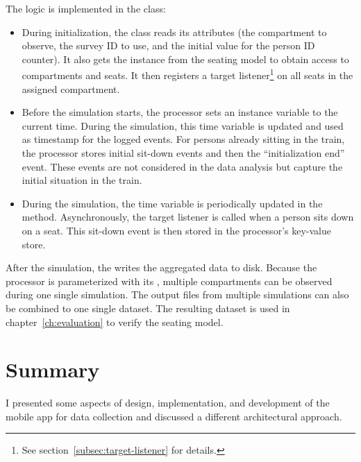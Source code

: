 The logic is implemented in the  class:

\begin{itemize}

  \item During initialization, the class reads its attributes (the compartment
    to observe, the survey \acs{ID} to use, and the initial value for the person
    \acs{ID} counter).
    It also gets the  instance from the seating model to obtain
    access to compartments and seats.
    It then registers a target listener\footnote{See
    section~\ref{subsec:target-listener} for details.} on all seats in the
    assigned compartment.

  \item Before the simulation starts, the processor sets an instance variable to
    the current time.
    During the simulation, this time variable is updated and used as timestamp
    for the logged events.
    For persons already sitting in the train, the processor stores initial
    sit-down events and then the ``initialization end'' event.
    These events are not considered in the data analysis but capture the initial
    situation in the train.

  \item During the simulation, the time variable is periodically updated in the
     method.
    Asynchronously, the target listener is called when a person sits down on a
    seat.
    This sit-down event is then stored in the processor's key-value store.

\end{itemize}

After the simulation, the  writes the aggregated data
to disk.
Because the processor is parameterized with its
, multiple compartments can be observed during
one single simulation.
The output files from multiple simulations can also be combined to one single
dataset.
The resulting dataset is used in chapter~\ref{ch:evaluation} to verify the
seating model.

\section{Summary}

I presented some aspects of design, implementation, and development of the
mobile app for data collection and discussed a different architectural approach.

